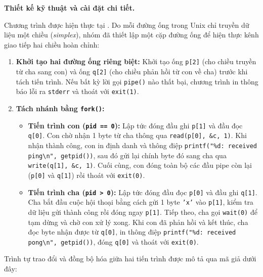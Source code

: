 \documentclass[12pt,a4paper]{article}
\begin{document}
\textbf{Thiết kế kỹ thuật và cài đặt chi tiết.}

Chương trình được hiện thực tại . Do mỗi đường ống trong Unix chỉ truyền dữ liệu một chiều (\textit{simplex}), nhóm đã thiết lập một cặp đường ống để hiện thực kênh giao tiếp hai chiều hoàn chỉnh:
\begin{enumerate}
  \item \textbf{Khởi tạo hai đường ống riêng biệt:} Khởi tạo ống \texttt{p[2]} (cho chiều truyền từ cha sang con) và ống \texttt{q[2]} (cho chiều phản hồi từ con về cha) trước khi tách tiến trình. Nếu bất kỳ lời gọi \texttt{pipe()} nào thất bại, chương trình in thông báo lỗi ra \texttt{stderr} và thoát với \texttt{exit(1)}.
  \item \textbf{Tách nhánh bằng \texttt{fork()}:}
  \begin{itemize}
    \item \textbf{Tiến trình con (\texttt{pid == 0}):} Lập tức đóng đầu ghi \texttt{p[1]} và đầu đọc \texttt{q[0]}. Con chờ nhận 1 byte từ cha thông qua \texttt{read(p[0], \&c, 1)}. Khi nhận thành công, con in định danh và thông điệp \texttt{printf("\%d: received ping\textbackslash n", getpid())}, sau đó gửi lại chính byte đó sang cha qua \texttt{write(q[1], \&c, 1)}. Cuối cùng, con đóng toàn bộ các đầu pipe còn lại (\texttt{p[0]} và \texttt{q[1]}) rồi thoát với \texttt{exit(0)}.
    \item \textbf{Tiến trình cha (\texttt{pid > 0}):} Lập tức đóng đầu đọc \texttt{p[0]} và đầu ghi \texttt{q[1]}. Cha bắt đầu cuộc hội thoại bằng cách gửi 1 byte \texttt{'x'} vào \texttt{p[1]}, kiểm tra dữ liệu gửi thành công rồi đóng ngay \texttt{p[1]}. Tiếp theo, cha gọi \texttt{wait(0)} để tạm dừng và chờ con xử lý xong. Khi con đã phản hồi và kết thúc, cha đọc byte nhận được từ \texttt{q[0]}, in thông điệp \texttt{printf("\%d: received pong\textbackslash n", getpid())}, đóng \texttt{q[0]} và thoát với \texttt{exit(0)}.
  \end{itemize}
\end{enumerate}

Trình tự trao đổi và đồng bộ hóa giữa hai tiến trình được mô tả qua mã giả dưới đây:
\end{document}

